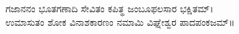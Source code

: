 \cleartoleftpage
\begin{titlepage}
    \begin{center}
        \vspace*{0.5cm}
        {\color{blue}ಗಜಾನನಂ ಭೂತಗಣಾದಿ ಸೇವಿತಂ ಕಪಿತ್ಥ ಜಂಬೂಫಲಸಾರ ಭಕ್ಷಿತಮ್।\\
		ಉಮಾಸುತಂ ಶೋಕ ವಿನಾಶಕಾರಣಂ ನಮಾಮಿ ವಿಘ್ನೇಶ್ವರ ಪಾದಪಂಕಜಮ್॥}
        {\Huge
		}
        \vspace{1.0cm}
            
        
		
            
        \vfill
            
        
            
        \vspace{0.1cm}
        {\color{white}    
        }
    \end{center}
\end{titlepage}
\nopagecolor%